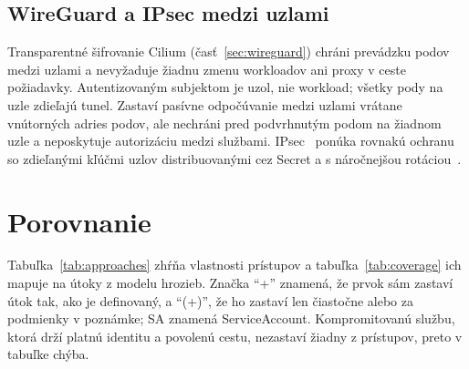 \subsection{WireGuard a IPsec medzi uzlami}

Transparentné šifrovanie Cilium (časť~\ref{sec:wireguard}) chráni prevádzku podov medzi uzlami a nevyžaduje žiadnu zmenu workloadov ani proxy v ceste požiadavky. Autentizovaným subjektom je uzol, nie workload; všetky pody na uzle zdieľajú tunel. Zastaví pasívne odpočúvanie medzi uzlami vrátane vnútorných adries podov, ale nechráni pred podvrhnutým podom na žiadnom uzle a neposkytuje autorizáciu medzi službami. IPsec~\cite{rfc4301} ponúka rovnakú ochranu so zdieľanými kľúčmi uzlov distribuovanými cez Secret a s náročnejšou rotáciou~\cite{cilium-ipsec}.

\section{Porovnanie}
\label{sec:comparison}

Tabuľka~\ref{tab:approaches} zhŕňa vlastnosti prístupov a tabuľka~\ref{tab:coverage} ich mapuje na útoky z modelu hrozieb. Značka \enquote{+} znamená, že prvok sám zastaví útok tak, ako je definovaný, a \enquote{(+)}, že ho zastaví len čiastočne alebo za podmienky v poznámke; SA znamená ServiceAccount. Kompromitovanú službu, ktorá drží platnú identitu a povolenú cestu, nezastaví žiadny z prístupov, preto v tabuľke chýba.

